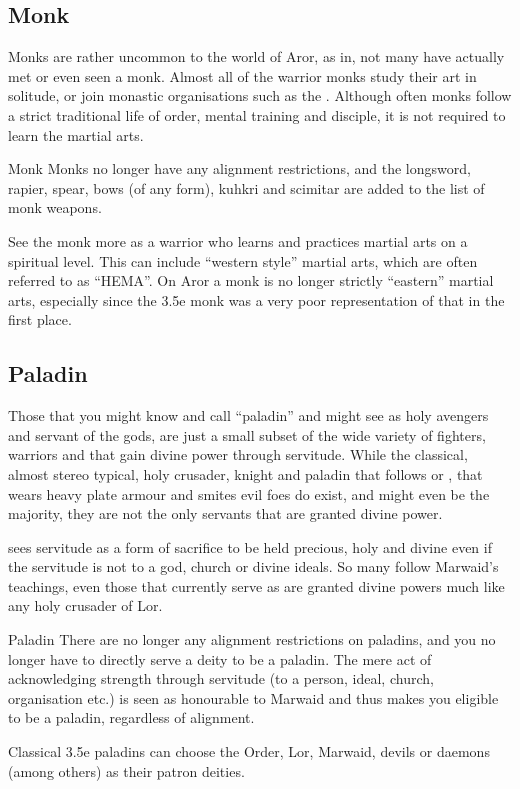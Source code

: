 \subsection{Monk}
\label{sec:Monk}

Monks are rather uncommon to the world of Aror, as in, not many have actually
met or even seen a monk. Almost all of the warrior monks study their art in
solitude, or join monastic organisations such as the .
Although often monks follow a strict traditional life of order, mental training
and disciple, it is not required to learn the martial arts.

\begin{35e}{Monk}
  Monks no longer have any alignment restrictions, and the longsword, rapier,
  spear, bows (of any form), kuhkri and scimitar are added to the list of monk
  weapons.
\end{35e}

\begin{note}
  See the monk more as a warrior who learns and practices martial arts on a
  spiritual level. This can include ``western style'' martial arts, which are
  often referred to as ``HEMA''. On Aror a monk is no longer strictly
  ``eastern'' martial arts, especially since the 3.5e monk was a very poor
  representation of that in the first place.
\end{note}

\subsection{Paladin}
\label{sec:Paladin}

Those that you might know and call ``paladin'' and might see as holy avengers
and servant of the gods, are just a small subset of the wide variety of
fighters, warriors and that gain divine power through servitude. While the
classical, almost stereo typical, holy crusader, knight and paladin that
follows  or , that wears heavy plate
armour and smites evil foes do exist, and might even be the majority, they are
not the only servants that are granted divine power.

 sees servitude as a form of sacrifice to be held
precious, holy and divine even if the servitude is not to a god, church or
divine ideals. So many follow Marwaid's teachings, even those that currently
serve as  are granted divine powers much like any holy
crusader of Lor.

\begin{35e}{Paladin}
  There are no longer any alignment restrictions on paladins, and you no longer
  have to directly serve a deity to be a paladin. The mere act of acknowledging
  strength through servitude (to a person, ideal, church, organisation etc.) is
  seen as honourable to Marwaid and thus makes you eligible to be a paladin,
  regardless of alignment.

  Classical 3.5e paladins can choose the Order, Lor, Marwaid, devils or
  daemons (among others) as their patron deities.
\end{35e}
